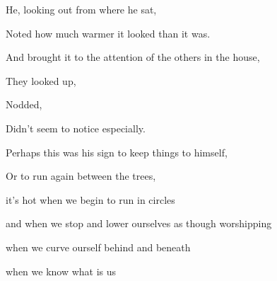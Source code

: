 \documentclass[11pt]{article}
\begin{document}
\begingroup
\begin{center}
He, looking out from where he sat,
\end{center}
\endgroup

\begingroup
\begin{center}
Noted how much warmer it looked than it was.
\end{center}
\endgroup

\begingroup
\begin{center}
And brought it to the attention of the others in the house,
\end{center}
\endgroup

\begingroup
\begin{center}
They looked up,
\end{center}
\endgroup

\begingroup
\begin{center}
Nodded,
\end{center}
\endgroup

\begingroup
\begin{center}
Didn't seem to notice especially.
\end{center}
\endgroup

\begingroup
\begin{center}
Perhaps this was his sign to keep things to himself,
\end{center}
\endgroup

\begingroup
\begin{center}
Or to run again between the trees,
\end{center}
\endgroup

\vspace*{2\baselineskip}

\begingroup
\begin{center}
it's hot when we begin to run in circles
\rightskip\leftskip
\end{center}
\endgroup

\begingroup
\begin{center}
and when we stop and lower ourselves as though worshipping
\rightskip\leftskip
\end{center}
\endgroup

\begingroup
\begin{center}
when we curve ourself behind and beneath
\rightskip\leftskip
\end{center}
\endgroup

\begingroup
\begin{center}
when we know what is us
\rightskip\leftskip
\end{center}
\endgroup
\end{document}
